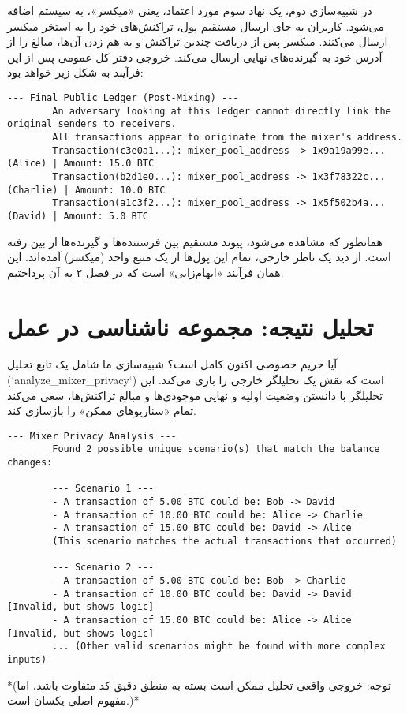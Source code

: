 در شبیه‌سازی دوم، یک نهاد سوم مورد اعتماد، یعنی «میکسر»، به سیستم اضافه می‌شود. کاربران به جای ارسال مستقیم پول، تراکنش‌های خود را به استخر میکسر ارسال می‌کنند. میکسر پس از دریافت چندین تراکنش و به هم زدن آن‌ها، مبالغ را از آدرس خود به گیرنده‌های نهایی ارسال می‌کند. خروجی دفتر کل عمومی پس از این فرآیند به شکل زیر خواهد بود:

\begin{latin}
	\begin{lstlisting}[caption={خروجی دفتر کل پس از استفاده از میکسر}, label=list:mixer_output]
		--- Final Public Ledger (Post-Mixing) ---
		An adversary looking at this ledger cannot directly link the original senders to receivers.
		All transactions appear to originate from the mixer's address.
		Transaction(c3e0a1...): mixer_pool_address -> 1x9a19a99e... (Alice) | Amount: 15.0 BTC
		Transaction(b2d1e0...): mixer_pool_address -> 1x3f78322c... (Charlie) | Amount: 10.0 BTC
		Transaction(a1c3f2...): mixer_pool_address -> 1x5f502b4a... (David) | Amount: 5.0 BTC
	\end{lstlisting}
\end{latin}

همانطور که مشاهده می‌شود، پیوند مستقیم بین فرستنده‌ها و گیرنده‌ها از بین رفته است. از دید یک ناظر خارجی، تمام این پول‌ها از یک منبع واحد (میکسر) آمده‌اند. این همان فرآیند «ابهام‌زایی» است که در فصل ۲ به آن پرداختیم.

\section{تحلیل نتیجه: مجموعه ناشناسی در عمل}

آیا حریم خصوصی اکنون کامل است؟ شبیه‌سازی ما شامل یک تابع تحلیل (`analyze\_mixer\_privacy`) است که نقش یک تحلیلگر خارجی را بازی می‌کند. این تحلیلگر با دانستن وضعیت اولیه و نهایی موجودی‌ها و مبالغ تراکنش‌ها، سعی می‌کند تمام «سناریوهای ممکن» را بازسازی کند.

\begin{latin}
	\begin{lstlisting}[caption={خروجی تحلیل حریم خصوصی میکسر}, label=list:analysis_output]
		--- Mixer Privacy Analysis ---
		Found 2 possible unique scenario(s) that match the balance changes:
		
		--- Scenario 1 ---
		- A transaction of 5.00 BTC could be: Bob -> David
		- A transaction of 10.00 BTC could be: Alice -> Charlie
		- A transaction of 15.00 BTC could be: David -> Alice
		(This scenario matches the actual transactions that occurred)
		
		--- Scenario 2 ---
		- A transaction of 5.00 BTC could be: Bob -> Charlie
		- A transaction of 10.00 BTC could be: David -> David [Invalid, but shows logic]
		- A transaction of 15.00 BTC could be: Alice -> Alice [Invalid, but shows logic]
		... (Other valid scenarios might be found with more complex inputs)
	\end{lstlisting}
\end{latin}
*(توجه: خروجی واقعی تحلیل ممکن است بسته به منطق دقیق کد متفاوت باشد، اما مفهوم اصلی یکسان است.)*


